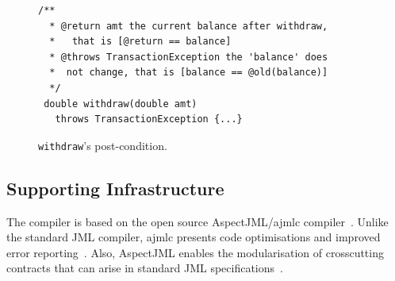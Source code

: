 \begin{figure}
\centering
\begin{lstlisting}[basicstyle=\footnotesize\ttfamily,name=figxpi, frame=lines, mathescape=true]
 /**
  * @return amt the current balance after withdraw,
  *   that is [@return == balance]
  * @throws TransactionException the 'balance' does
  *  not change, that is [balance == @old(balance)]
  */
 double withdraw(double amt) 
   throws TransactionException {...}
\end{lstlisting}
\caption{\texttt{withdraw}'s post-condition.}
\label{fig:post-example}
\end{figure}



\subsection{Supporting Infrastructure}

The \contractjdoc{} compiler is based on the open source AspectJML/ajmlc compiler~\cite{aspectjml,ajmlc,Rebelo-etal08}.
Unlike the standard JML compiler, ajmlc presents code optimisations and improved error reporting~\cite{ajmlc}.
Also, AspectJML enables the modularisation
of crosscutting contracts that can arise in standard
JML specifications~\cite{aspectjml}.

